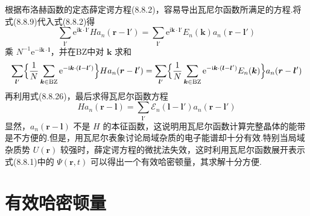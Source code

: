 根据布洛赫函数的定态薛定谔方程(8.8.2)，容易导出瓦尼尔函数所满足的方程.将式(8.8.9)代入式(8.8.2)得
\begin{equation}
  \sum_{\boldsymbol{l}'}\mathrm{e}^{\mathrm{i}\boldsymbol{k}\cdot\boldsymbol{l}'}Ha_{n}(\boldsymbol{r}-\boldsymbol{l}')
  =\sum_{\boldsymbol{l}'}\mathrm{e}^{\mathrm{i}\boldsymbol{k}\cdot\boldsymbol{l}'}E_{n}(\boldsymbol{k})a_{n}(\boldsymbol{r}-\boldsymbol{l}')
\end{equation}
乘 $N^{-1}\mathrm{e}^{-\mathrm{i}\boldsymbol{k}\cdot\boldsymbol{l}}$，并在BZ中对 $\boldsymbol{k}$ 求和
\begin{equation}
  \sum_{\boldsymbol{l}'}\Bigl\{\frac{1}{N}\sum_{\boldsymbol{k}\in\mathrm{BZ}}\mathrm{e}^{-\mathrm{i}\boldsymbol{k}\cdot(\boldsymbol{l}-\boldsymbol{l}')}\Bigr\}Ha_{n}(\boldsymbol{r}-\boldsymbol{l}')
  =\sum_{\boldsymbol{l}'}\Bigl\{\frac{1}{N}\sum_{\boldsymbol{k}\in\mathrm{BZ}}\mathrm{e}^{-\mathrm{i}\boldsymbol{k}\cdot(\boldsymbol{l}-\boldsymbol{l}')}E_{n}(\boldsymbol{k})\Bigr\}a_{n}(\boldsymbol{r}-\boldsymbol{l}')
\end{equation}
再利用式(8.8.26)，最后求得瓦尼尔函数方程
\begin{equation}
  Ha_{n}(\boldsymbol{r}-\boldsymbol{l})
  =\sum_{\boldsymbol{l}'}\mathscr{E}_{n}(\boldsymbol{l}-\boldsymbol{l}')a_{n}(\boldsymbol{r}-\boldsymbol{l}')
\end{equation}
显然，$a_{n}(\boldsymbol{r}-\boldsymbol{l})$ 不是 $H$ 的本征函数，这说明用瓦尼尔函数计算完整晶体的能带是不方便的.但是，用瓦尼尔表象讨论局域杂质的电子能谱却十分有效.特别当局域杂质势 $U(\boldsymbol{r})$ 较强时，薛定谔方程的微扰法失效，这时利用瓦尼尔函数展开表示式(8.8.1)中的 $\Psi(\boldsymbol{r},t)$ 可以得出一个有效哈密顿量，其求解十分方便.
\section{有效哈密顿量}

